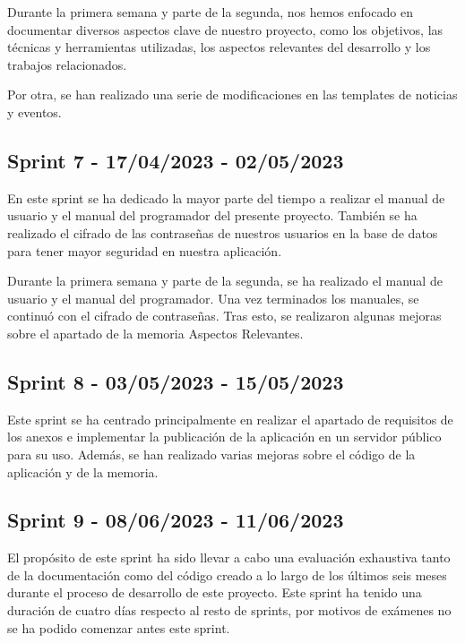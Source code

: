 Durante la primera semana y parte de la segunda, nos hemos enfocado en documentar diversos aspectos clave de nuestro proyecto, como los objetivos, las técnicas y herramientas utilizadas, los aspectos relevantes del desarrollo y los trabajos relacionados.

Por otra, se han realizado una serie de modificaciones en las templates de noticias y eventos.



\subsection{Sprint 7 - 17/04/2023 - 02/05/2023}

En este sprint se ha dedicado la mayor parte del tiempo a realizar el manual de usuario y el manual del programador del presente  proyecto. También se ha realizado el cifrado de las contraseñas de nuestros usuarios en la base de datos para tener mayor seguridad en nuestra aplicación.

Durante la primera semana y parte de la segunda, se ha realizado el manual de usuario y el manual del programador.
Una vez terminados los manuales, se continuó con el cifrado de contraseñas. Tras esto, se realizaron algunas mejoras sobre el apartado de la memoria Aspectos Relevantes.


\subsection{Sprint 8 - 03/05/2023 - 15/05/2023}

Este sprint se ha centrado principalmente en realizar el apartado de requisitos de los anexos e implementar la publicación de la aplicación en un servidor público para su uso. Además, se han realizado varias mejoras sobre el código de la aplicación y de la memoria.


\subsection{Sprint 9 - 08/06/2023 - 11/06/2023}
El propósito de este sprint ha sido llevar a cabo una evaluación exhaustiva tanto de la documentación como del código creado a lo largo de los últimos seis meses durante el proceso de desarrollo de este proyecto. Este sprint ha tenido una duración de cuatro días respecto al resto de sprints, por motivos de exámenes no se ha podido comenzar antes este sprint.


